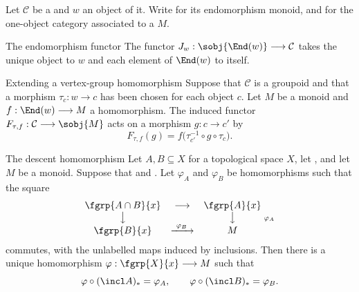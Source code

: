 Let $\mathcal C$ be a  and $w$ an
object of it.  Write  for its
endomorphism monoid, and 
for the one-object category associated to a  $M$.

\begin{definition}[id=4.1]{The endomorphism functor}
The functor $J_w:\sobj{\End(w)}\longrightarrow\mathcal C$ takes the unique
object to $w$ and each element of $\End(w)$ to itself.
\end{definition}

\begin{definition}[id=4.2]{Extending a vertex-group homomorphism}
Suppose that $\mathcal C$ is a groupoid and that a morphism
$\tau_c:w\longrightarrow c$ has been chosen for each object $c$.  Let $M$ be
a monoid and $f:\End(w)\longrightarrow M$ a homomorphism.
The induced functor $F_{\tau,f}:\mathcal C\longrightarrow\sobj{M}$ acts on a
morphism $g:c\longrightarrow c'$ by
\begin{equation}\label{eq:4.2-vertex-group-functor}
  F_{\tau,f}(g)=f\bigl(\tau_{c'}^{-1}\circ g\circ\tau_c\bigr).
\end{equation}
\end{definition}

\begin{samepage}
\begin{theorem}[id=4.3]{The descent homomorphism}
Let $A,B\subseteq X$ for a topological space $X$, let \hypBasepoint, and let
$M$ be a monoid.  Suppose that \hypCoverTwo and \hypPathConnected.
Let $\varphi_A$ and $\varphi_B$ be homomorphisms such that the square
\[
  \begin{array}{ccc@{}l}
    \fgrp{A\cap B}{x} & \longrightarrow & \fgrp{A}{x} & \\
    \big\downarrow && \big\downarrow & \;\scriptstyle\varphi_A \\
    \fgrp{B}{x} & \xrightarrow{\ \varphi_B\ } & M &
  \end{array}
\]
commutes, with the unlabelled maps induced by inclusions.  Then there is a unique
homomorphism $\varphi:\fgrp{X}{x}\longrightarrow M$ such that
\[
  \varphi\circ(\incl A)_*=\varphi_A,\qquad
  \varphi\circ(\incl B)_*=\varphi_B.
\]
\end{theorem}
\end{samepage}

